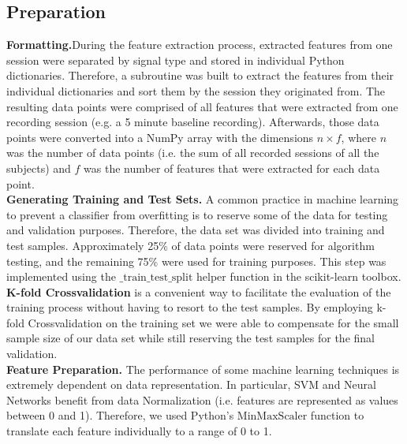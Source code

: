 \subsection{Preparation} 
\textbf{Formatting.}During the feature extraction process, extracted features from one session were separated by signal type and stored in individual Python dictionaries. Therefore, a subroutine was built to extract the features from their individual dictionaries and sort them by the session they originated from. The resulting data points were comprised of all features that were extracted from one recording session (e.g. a 5 minute baseline recording).
Afterwards, those data points were converted into a NumPy array with the dimensions $n \times f$, where $n$ was the number of data points (i.e. the sum of all recorded sessions of all the subjects) and $f$ was the number of features that were extracted for each data point.\\
\textbf{Generating Training and Test Sets.} A common practice in machine learning to prevent a classifier from overfitting is to reserve some of the data for testing and validation purposes. Therefore, the data set was divided into training and test samples. Approximately 25\% of data points were reserved for algorithm testing, and the remaining 75\% were used for training purposes. This step was implemented using the $\text{\_train\_test\_split}$ helper function in the scikit-learn toolbox.\\
\textbf{K-fold Crossvalidation} is a convenient way to facilitate the evaluation of the training process without having to resort to the test samples. By employing k-fold Crossvalidation on the training set we were able to compensate for the small sample size of our data set while still reserving the test samples for the final validation.\\
\textbf{Feature Preparation.} The performance of some machine learning techniques is extremely dependent on data representation. In particular, SVM and Neural Networks benefit from data Normalization (i.e. features are represented as values between 0 and 1). Therefore, we used Python's $\text{MinMaxScaler}$ function to translate each feature individually to a range of 0 to 1.\\

